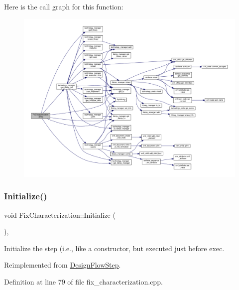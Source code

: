 Here is the call graph for this function\+:
\nopagebreak
\begin{figure}[H]
\begin{center}
\leavevmode
\includegraphics[width=350pt]{d9/dc5/classFixCharacterization_a45c45b820d574101ae07841c5f773b6c_cgraph}
\end{center}
\end{figure}
\mbox{\label{classFixCharacterization_a1abe993122a5f39bbabbe3e1fca6141d}} 
\subsubsection{\texorpdfstring{Initialize()}{Initialize()}}
{\footnotesize\ttfamily void Fix\+Characterization\+::\+Initialize (\begin{DoxyParamCaption}{ }\end{DoxyParamCaption})\hspace{0.3cm}{\ttfamily [override]}, {\ttfamily [virtual]}}



Initialize the step (i.\+e., like a constructor, but executed just before exec. 



Reimplemented from \hyperlink{classDesignFlowStep_a44b50683382a094976e1d432a7784799}{Design\+Flow\+Step}.



Definition at line 79 of file fix\+\_\+characterization.\+cpp.



